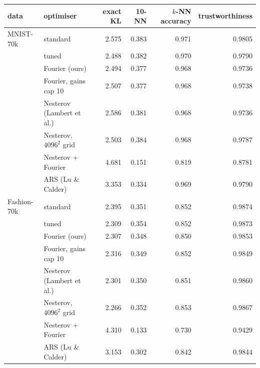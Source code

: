 \begin{tabular}{llrrrr}\toprule
data & optimiser & exact KL & 10-NN & $k$-NN accuracy & trustworthiness\\\midrule
MNIST-70k & standard & 2.575 & 0.383 & 0.971 & 0.9805\\
 & tuned & 2.488 & 0.382 & 0.970 & 0.9790\\
 & Fourier (ours) & 2.494 & 0.377 & 0.968 & 0.9736\\
 & Fourier, gains cap 10 & 2.507 & 0.377 & 0.968 & 0.9738\\
 & Nesterov (Lambert et al.) & 2.586 & 0.381 & 0.968 & 0.9736\\
 & Nesterov, $4096^2$ grid & 2.503 & 0.384 & 0.968 & 0.9787\\
 & Nesterov + Fourier & 4.681 & 0.151 & 0.819 & 0.8781\\
 & ARS (Lu \& Calder) & 3.353 & 0.334 & 0.969 & 0.9790\\
Fashion-70k & standard & 2.395 & 0.351 & 0.852 & 0.9874\\
 & tuned & 2.309 & 0.354 & 0.852 & 0.9873\\
 & Fourier (ours) & 2.307 & 0.348 & 0.850 & 0.9853\\
 & Fourier, gains cap 10 & 2.316 & 0.349 & 0.852 & 0.9849\\
 & Nesterov (Lambert et al.) & 2.301 & 0.350 & 0.851 & 0.9860\\
 & Nesterov, $4096^2$ grid & 2.266 & 0.352 & 0.853 & 0.9867\\
 & Nesterov + Fourier & 4.310 & 0.133 & 0.730 & 0.9429\\
 & ARS (Lu \& Calder) & 3.153 & 0.302 & 0.842 & 0.9844\\
\bottomrule\end{tabular}
